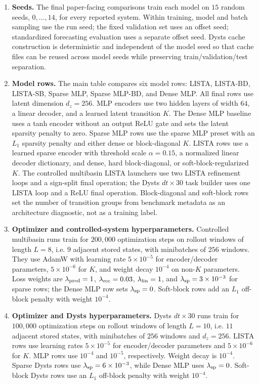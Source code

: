 \begin{enumerate}
  \item \textbf{Seeds.} The final paper-facing comparisons train each model on \(15\) random seeds, \(0,\ldots,14\), for every reported system. Within training, model and batch sampling use the run seed; the fixed validation set uses an offset seed; standardized forecasting evaluation uses a separate offset seed. Dysts cache construction is deterministic and independent of the model seed so that cache files can be reused across model seeds while preserving train/validation/test separation.

  \item \textbf{Model rows.} The main table compares six model rows: LISTA, LISTA-BD, LISTA-SB, Sparse MLP, Sparse MLP-BD, and Dense MLP. All final rows use latent dimension \(d_z=256\). MLP encoders use two hidden layers of width \(64\), a linear decoder, and a learned latent transition \(K\). The Dense MLP baseline uses a tanh encoder without an output ReLU gate and sets the latent sparsity penalty to zero. Sparse MLP rows use the sparse MLP preset with an \(L_1\) sparsity penalty and either dense or block-diagonal \(K\). LISTA rows use a learned sparse encoder with threshold scale \(\alpha=0.15\), a normalized linear decoder dictionary, and dense, hard block-diagonal, or soft-block-regularized \(K\). The controlled multibasin LISTA launchers use two LISTA refinement loops and a sign-split final operation; the Dysts \(dt\times30\) task builder uses one LISTA loop and a ReLU final operation. Block-diagonal and soft-block rows set the number of transition groups from benchmark metadata as an architecture diagnostic, not as a training label.

  \item \textbf{Optimizer and controlled-system hyperparameters.} Controlled multibasin runs train for \(200{,}000\) optimization steps on rollout windows of length \(L=8\), i.e. \(9\) adjacent stored states, with minibatches of \(256\) windows. They use AdamW with learning rate \(5\times10^{-5}\) for encoder/decoder parameters, \(5\times10^{-6}\) for \(K\), and weight decay \(10^{-4}\) on non-\(K\) parameters. Loss weights are \(\lambda_{\rm pred}=1\), \(\lambda_{\rm rec}=0.03\), \(\lambda_{\rm lin}=1\), and \(\lambda_{\rm sp}=3\times10^{-3}\) for sparse rows; the Dense MLP row sets \(\lambda_{\rm sp}=0\). Soft-block rows add an \(L_1\) off-block penalty with weight \(10^{-4}\).

  \item \textbf{Optimizer and Dysts hyperparameters.} Dysts \(dt\times30\) runs train for \(100{,}000\) optimization steps on rollout windows of length \(L=10\), i.e. \(11\) adjacent stored states, with minibatches of \(256\) windows and \(d_z=256\). LISTA rows use learning rates \(5\times10^{-5}\) for encoder/decoder parameters and \(5\times10^{-6}\) for \(K\). MLP rows use \(10^{-4}\) and \(10^{-5}\), respectively. Weight decay is \(10^{-4}\). Sparse Dysts rows use \(\lambda_{\rm sp}=6\times10^{-3}\), while Dense MLP uses \(\lambda_{\rm sp}=0\). Soft-block Dysts rows use an \(L_1\) off-block penalty with weight \(10^{-4}\).


\end{enumerate}
